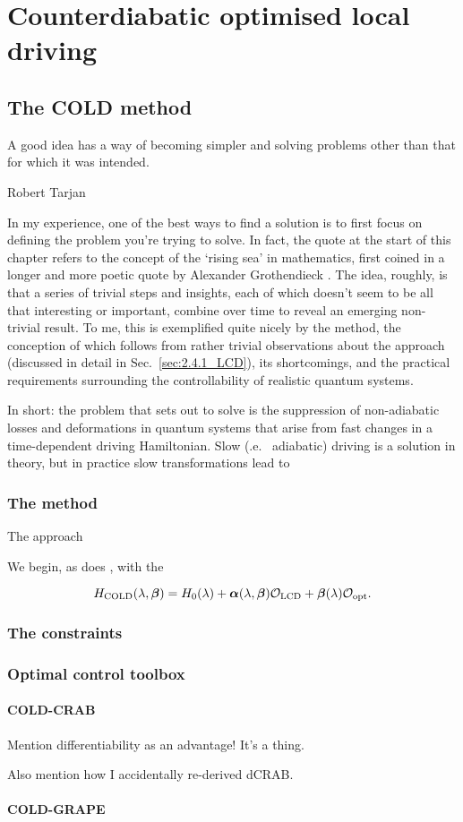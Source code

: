 \part{Counterdiabatic optimised local driving}

\chapter{The COLD method}\label{chap:4_COLD}

\epigraph{A good idea has a way of becoming simpler and solving problems other than that for which it was intended.}{Robert Tarjan}

In my experience, one of the best ways to find a solution is to first focus on defining the problem you're trying to solve. In fact, the quote at the start of this chapter refers to the concept of the `rising sea' in mathematics, first coined in a longer and more poetic quote by Alexander Grothendieck \cite{mclarty_grothendieck_nodate}. The idea, roughly, is that a series of trivial steps and insights, each of which doesn't seem to be all that interesting or important, combine over time to reveal an emerging non-trivial result. To me, this is exemplified quite nicely by the  method, the conception of which follows from rather trivial observations about the  approach (discussed in detail in Sec.~\ref{sec:2.4.1_LCD}), its shortcomings, and the practical requirements surrounding the controllability of realistic quantum systems. 

In short: the problem that  sets out to solve is the suppression of non-adiabatic losses and deformations in quantum systems that arise from fast changes in a time-dependent driving Hamiltonian. Slow (\@i.e.~ adiabatic) driving is a solution in theory, but in practice slow transformations lead to 

\section{The method}

The  approach 

We begin, as does , with the 

\begin{equation}\label{eq:expandedH}
H_{\rm COLD}(\lambda,\boldsymbol{\beta}) = H_0(\lambda) + {\boldsymbol \alpha}(\lambda,\boldsymbol{\beta}) \mathcal{O}_{\rm LCD} + \boldsymbol{\beta}(\lambda) \mathcal{O}_{\rm opt}.
\end{equation}

\section{The constraints}

\section{Optimal control toolbox}

\subsection{COLD-CRAB}

Mention differentiability as an advantage! It's a thing.

Also mention how I accidentally re-derived dCRAB.

\subsection{COLD-GRAPE}